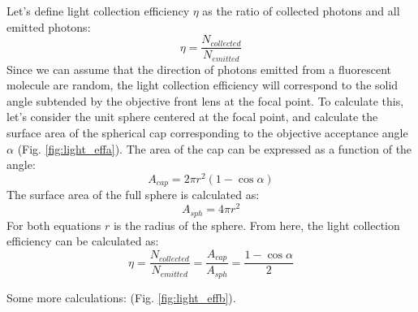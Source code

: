 Let's define light collection efficiency $\eta$ as the ratio of collected photons and all emitted photons:
\[
\eta = \frac{N_{collected}}{N_{emitted}}
\]
Since we can assume that the direction of photons emitted from a fluorescent molecule are random, the light collection efficiency will correspond to the solid angle subtended by the objective front lens at the focal point. To calculate this, let's consider the unit sphere centered at the focal point, and calculate the surface area of the spherical cap corresponding to the objective acceptance angle $\alpha$ (Fig. \ref{fig:light_effa}). The area of the cap can be expressed as a function of the angle:
\[
A_{cap} = 2\pi r^2 (1-\cos \alpha)
\]
The surface area of the full sphere is calculated as:
\[
A_{sph} = 4 \pi r^2
\]
For both equations $r$ is the radius of the sphere. From here, the light collection efficiency can be calculated as:
\[
\eta = \frac{N_{collected}}{N_{emitted}} = \frac{A_{cap}}{A_{sph}} = \frac{1-\cos \alpha}{2}
\]

Some more calculations: (Fig. \ref{fig:light_effb}).

